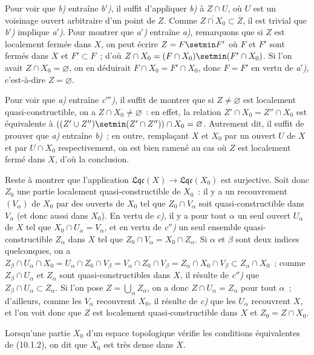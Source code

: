 Pour voir que \emph{b)} entraîne \emph{b$'$)}, il suffit d'appliquer
\emph{b)} à $Z\cap U$, où $U$ est un voisinage ouvert arbitraire d'un point de
$Z$. Comme $\overline{Z\cap X_0}\subset\overline{Z}$, il est trivial
que \emph{b$'$)} implique \emph{a$'$)}. Pour montrer que \emph{a$'$)} entraîne
\emph{a)}, remarquons que si $Z$ est localement fermée dans $X$, on peut
écrire $Z=F\setmin F'$ où $F$ et $F'$ sont fermés dans $X$ et $F'\subset F$~; d'où
$Z\cap X_0=(F\cap X_0)\setmin(F'\cap X_0)$. Si l'on avait
$Z\cap X_0=\varnothing$, on en déduirait $F\cap X_0=F'\cap X_0$, donc
$F=F'$ en vertu de \emph{a$'$)}, c'est-à-dire $Z=\varnothing$.

Pour voir que \emph{a)} entraîne \emph{c$'''$)}, il suffit de montrer que si
$Z\neq\varnothing$ est localement quasi-constructible, on a
$Z\cap X_0\neq\varnothing$~: en effet, la relation
$Z'\cap X_0=Z''\cap X_0$ est équivalente à
$((Z'\cup Z'')\setmin(Z'\cap Z''))\cap X_0=\varnothing$. Autrement dit, il suffit de
prouver que \emph{a)} entraîne \emph{b)}~; en outre, remplaçant $X$ et $X_0$
par un ouvert $U$ de $X$ et par $U\cap X_0$ respectivement, on est bien
ramené au cas où $Z$ est localement fermé dans $X$, d'où la conclusion.

Reste à montrer que l'application
$\mathfrak{Lqc}(X)\to\mathfrak{Lqc}(X_0)$ est surjective. Soit donc $Z_0$ une
partie localement quasi-constructible de $X_0$~: il y a un recouvrement
$(V_\alpha)$ de $X_0$ par des ouverts de $X_0$ tel que $Z_0\cap V_\alpha$ soit
quasi-constructible dans $V_\alpha$ (et
donc aussi dans $X_0$). En vertu de \emph{c)}, il y a pour tout $\alpha$ un
seul ouvert $U_\alpha$ de $X$
tel que $X_0\cap U_\alpha=V_\alpha$, et en
vertu de \emph{c$''$)} un seul ensemble quasi-constructible $Z_\alpha$ dans
$X$ tel que $Z_0\cap V_\alpha=X_0\cap Z_\alpha$. Si $\alpha$ et $\beta$ sont
deux indices quelconques, on a
$Z_\beta\cap U_\alpha\cap X_0
=U_\alpha\cap Z_0\cap V_\beta
=V_\alpha\cap Z_0\cap V_\beta
=Z_\alpha\cap X_0\cap V_\beta
\subset Z_\alpha\cap X_0$~;
comme $Z_\beta\cap U_\alpha$ et $Z_\alpha$ sont quasi-constructibles dans
$X$, il résulte de \emph{c$''$)} que
$Z_\beta\cap U_\alpha\subset Z_\alpha$. Si l'on pose
$Z=\bigcup_\alpha Z_\alpha$, on a donc $Z\cap U_\alpha=Z_\alpha$ pour tout
$\alpha$~; d'ailleurs, comme les $V_\alpha$ recouvrent $X_0$, il résulte de
\emph{c)} que les $U_\alpha$ recouvrent $X$, et l'on voit donc que $Z$ est
localement quasi-constructible dans $X$ et $Z_0=Z\cap X_0$.

\begin{definition}[10.1.3]
\label{IV.10.1.3-fr}
Lorsqu'une partie $X_0$ d'un espace topologique vérifie les conditions
équivalentes de \textup{(10.1.2)}, on dit que $X_0$ est très dense dans $X$.
\end{definition}

